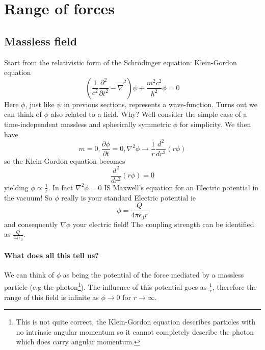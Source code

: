 \section{Range of forces}
\subsection{Massless field}
Start from the relativistic form of the Schr\"odinger equation: Klein-Gordon equation
\begin{equation*}
(\frac{1}{c^2}\frac{\partial^{2}}{\partial t^2}-\vec{\nabla}^2)\psi+\frac{m^2c^2}{\hbar^2}\phi=0
\end{equation*}
Here $\phi$, just like $\psi$ in previous sections, represents a wave-function. Turns out we can think of $\phi$ also related to a field. Why? Well consider the simple case of a time-independent massless and spherically symmetric $\phi$ for simplicity. We then have
\[m=0,\frac{\partial\phi}{\partial t}=0,\nabla^2\phi\rightarrow \frac{1}{r}\frac{d^2}{dr^2}(r\phi)
\]
so the Klein-Gordon equation becomes
\[
\frac{d^2}{dr^2}(r\phi)=0
\]
yielding $\phi\propto\frac{1}{r}$. In fact $\nabla^2\phi=0$ IS Maxwell's equation for an Electric potential in the vacuum! So $\phi$ really is your standard Electric potential ie
\[\phi=\frac{Q}{4\pi\epsilon_{0}r}\] and consequently $\nabla\phi$ your electric field! The coupling strength can be identified as $\frac{Q}{4\pi\epsilon_{0}}$.

\paragraph{What does all this tell us?}We can think of $\phi$ as being the potential of the force mediated by a massless particle (e.g the photon\footnote{This is not quite correct, the Klein-Gordon equation describes particles with no intrinsic angular momentum so it cannot completely describe the photon which does carry angular momentum.}). The influence of this potential goes as $\frac{1}{r}$, therefore the range of this field is infinite as $\phi\to0$ for $r\to\infty$. 

